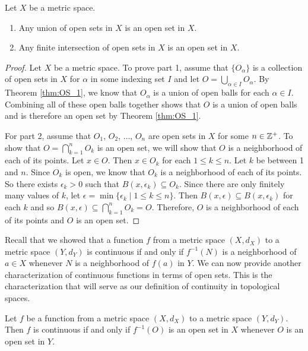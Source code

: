 \begin{theorem} Let $X$ be a metric space.
\begin{enumerate}
\item Any union of open sets in $X$ is an open set in $X$.
\item Any finite intersection of open sets in $X$ is an open set in $X$. 
\end{enumerate}
\end{theorem}

\begin{proof} Let $X$ be a metric space. To prove part 1, assume that $\{O_{\alpha}\}$ is a collection of open sets in $X$ for $\alpha$ in some indexing set $I$ and let $O = \bigcup_{\alpha \in I} O_{\alpha}$. By Theorem \ref{thm:OS_1}, we know that $O_{\alpha}$ is a union of open balls for each $\alpha \in I$. Combining all of these open balls together shows that $O$ is a union of open balls and is therefore an open set by Theorem \ref{thm:OS_1}. 

For part 2, assume that $O_1$, $O_2$, $\ldots$, $O_n$ are open sets in $X$ for some $n \in \mathbb{Z}^+$. To show that $O = \bigcap_{k=1}^n O_k$ is an open set, we will show that $O$ is a neighborhood of each of its points. Let $x \in O$. Then $x \in O_k$ for each $1 \leq k \leq n$. Let $k$ be between 1 and $n$. Since $O_k$ is open, we know that $O_k$ is a neighborhood of each of its points. So there exists $\epsilon_k > 0$ such that $B(x, \epsilon_k) \subseteq O_k$. Since there are only finitely many values of $k$, let $\epsilon = \min\{\epsilon_k \mid 1 \leq k \leq n\}$. Then $B(x, \epsilon) \subseteq B(x, \epsilon_k)$ for each $k$ and so $B(x, \epsilon) \subseteq \bigcap_{k=1}^n O_k = O$. Therefore, $O$ is a neighborhood of each of its points and $O$ is an open set.
\end{proof}


Recall that we showed that a function $f$ from a metric space $(X,d_X)$ to a metric space $(Y,d_Y)$ is continuous if and only if $f^{-1}(N)$ is a neighborhood of $a \in X$ whenever $N$ is a neighborhood of $f(a)$ in $Y$. We can now provide another characterization of continuous functions in terms of open sets. This is the characterization that will serve as our definition of continuity in topological spaces.

\begin{theorem} \label{thm:Open_continuity} Let $f$ be a function from a metric space $(X,d_X)$ to a metric space $(Y,d_Y)$. Then $f$ is continuous if and only if $f^{-1}(O)$ is an open set in $X$ whenever $O$ is an open set in $Y$.  
\end{theorem}

